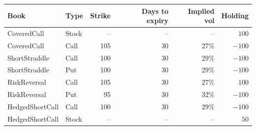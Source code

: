\begin{tabular}{llrrrr}
\toprule
Book & Type & Strike & Days to expiry & Implied vol & Holding \\
\midrule
CoveredCall & Stock & -- & -- & -- & $100$ \\
CoveredCall & Call & 105 & 30 & 27\% & $-100$ \\
ShortStraddle & Call & 100 & 30 & 29\% & $-100$ \\
ShortStraddle & Put & 100 & 30 & 29\% & $-100$ \\
RiskReversal & Call & 105 & 30 & 27\% & $100$ \\
RiskReversal & Put & 95 & 30 & 32\% & $-100$ \\
HedgedShortCall & Call & 100 & 30 & 29\% & $-100$ \\
HedgedShortCall & Stock & -- & -- & -- & $50$ \\
\bottomrule
\end{tabular}
